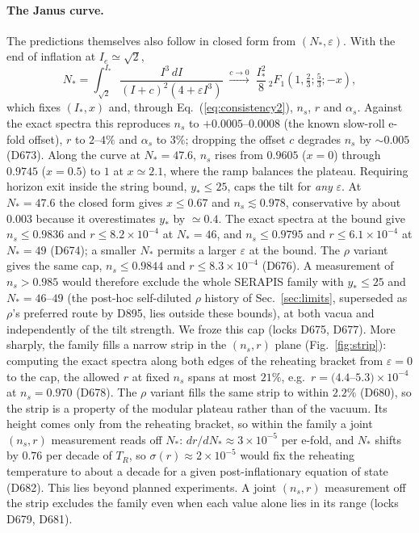\documentclass[aps,prd,twocolumn,superscriptaddress,nofootinbib,floatfix]{revtex4-2}
\begin{document}
\paragraph{The Janus curve.} The predictions themselves also follow in closed form from $(N_*,\varepsilon)$. With the end of inflation at $I_e\simeq\sqrt2$,
\begin{equation}
N_*=\int_{\sqrt2}^{I_*}\frac{I^3\,dI}{(I+c)^2(4+\varepsilon I^3)}\;\xrightarrow{c\to0}\;\frac{I_*^2}{8}\,{}_2F_1\!\left(1,\tfrac23;\tfrac53;-x\right),
\end{equation}
which fixes $(I_*,x)$ and, through Eq.~(\ref{eq:consistency2}), $n_s$, $r$ and $\alpha_s$. Against the exact spectra this reproduces $n_s$ to $+0.0005$--$0.0008$ (the known slow-roll e-fold offset), $r$ to $2$--$4\%$ and $\alpha_s$ to $3\%$; dropping the offset $c$ degrades $n_s$ by $\sim0.005$ (D673). Along the curve at $N_*=47.6$, $n_s$ rises from $0.9605$ ($x=0$) through $0.9745$ ($x=0.5$) to $1$ at $x\simeq2.1$, where the ramp balances the plateau. Requiring horizon exit inside the string bound, $y_*\le25$, caps the tilt for \emph{any} $\varepsilon$. At $N_*=47.6$ the closed form gives $x\le0.67$ and $n_s\lesssim0.978$, conservative by about $0.003$ because it overestimates $y_*$ by $\simeq0.4$. The exact spectra at the bound give $n_s\le0.9836$ and $r\le8.2\times10^{-4}$ at $N_*=46$, and $n_s\le0.9795$ and $r\le6.1\times10^{-4}$ at $N_*=49$ (D674); a smaller $N_*$ permits a larger $\varepsilon$ at the bound. The $\rho$ variant gives the same cap, $n_s\le0.9844$ and $r\le8.3\times10^{-4}$ (D676). A measurement of $n_s>0.985$ would therefore exclude the whole SERAPIS family with $y_*\le25$ and $N_*=46$--$49$ (the post-hoc self-diluted $\rho$ history of Sec.~\ref{sec:limits}, superseded as $\rho$'s preferred route by D895, lies outside these bounds), at both vacua and independently of the tilt strength. We froze this cap (locks D675, D677). More sharply, the family fills a narrow strip in the $(n_s,r)$ plane (Fig.~\ref{fig:strip}): computing the exact spectra along both edges of the reheating bracket from $\varepsilon=0$ to the cap, the allowed $r$ at fixed $n_s$ spans at most $21\%$, e.g.\ $r=(4.4$--$5.3)\times10^{-4}$ at $n_s=0.970$ (D678). The $\rho$ variant fills the same strip to within $2.2\%$ (D680), so the strip is a property of the modular plateau rather than of the vacuum. Its height comes only from the reheating bracket, so within the family a joint $(n_s,r)$ measurement reads off $N_*$: $dr/dN_*\approx3\times10^{-5}$ per e-fold, and $N_*$ shifts by $0.76$ per decade of $T_R$, so $\sigma(r)\approx2\times10^{-5}$ would fix the reheating temperature to about a decade for a given post-inflationary equation of state (D682). This lies beyond planned experiments. A joint $(n_s,r)$ measurement off the strip excludes the family even when each value alone lies in its range (locks D679, D681).
\end{document}
